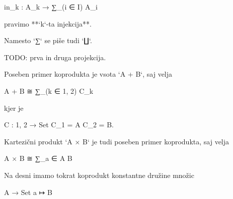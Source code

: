     in_k : A_k → ∑_(i ∈ I) A_i

pravimo **`k`-ta injekcija**.

Namesto `∑` se piše tudi `∐`.

TODO: prva in druga projekcija.

Poseben primer koprodukta je vsota `A + B`, saj velja

    A + B ≅ ∑_(k ∈ {1, 2}) C_k

kjer je

    C : {1, 2} → Set
    C_1 = A
    C_2 = B.

Kartezični produkt `A × B` je tudi poseben primer koprodukta, saj velja

    A × B ≅ ∑_{a ∈ A} B

Na desni imamo tokrat koprodukt konstantne družine množic

    A → Set
    a ↦ B


